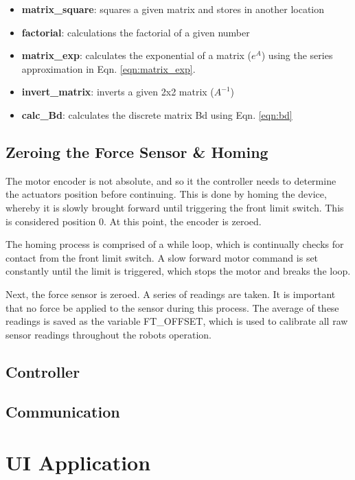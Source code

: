 \documentclass{article}
\begin{document}
	\begin{itemize}
		\item \textbf{matrix\_square}: squares a given matrix and stores in another location
		\item  \textbf{factorial}: calculations the factorial of a given number
		\item  \textbf{matrix\_exp}: calculates the exponential of a matrix ($e^A$) using the series approximation in Eqn. \ref{eqn:matrix_exp}.
		\item  \textbf{invert\_matrix}: inverts a given 2x2 matrix ($A^{-1}$)
		\item  \textbf{calc\_Bd}: calculates the discrete matrix Bd using Eqn. \ref{eqn:bd}
		
	\end{itemize}
	
	\subsection{Zeroing the Force Sensor \& Homing}
	
	The motor encoder is not absolute, and so it the controller needs to determine the actuators position before continuing. This is done by homing the device, whereby it is slowly brought forward until triggering the front limit switch. This is considered position 0. At this point, the encoder is zeroed. 
	
	The homing process is comprised of a while loop, which is continually checks for contact from the front limit switch. A slow forward motor command is set constantly until the limit is triggered, which stops the motor and breaks the loop. 
	
	Next, the force sensor is zeroed. A series of readings are taken. It is important that no force be applied to the sensor during this process. The average of these readings is saved as the variable FT\_OFFSET, which is used to calibrate all raw sensor readings throughout the robots operation.
	
	\subsection{Controller}
	
	
	
	\subsection{Communication}

\section{UI Application}
\end{document}
